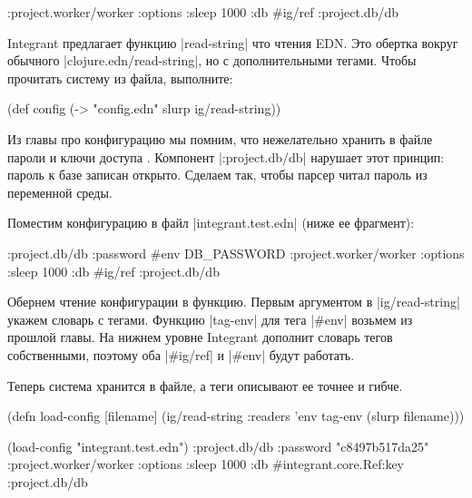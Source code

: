 \begin{english}
  \begin{clojure}
{:project.worker/worker {:options {:sleep 1000}
                         :db #ig/ref :project.db/db}}
  \end{clojure}
\end{english}

Integrant предлагает функцию \spverb|read-string| что чтения EDN. Это обертка
вокруг обычного \spverb|clojure.edn/read-string|, но с дополнительными
тегами. Чтобы прочитать систему из файла, выполните:

\begin{english}
  \begin{clojure}
(def config
  (-> "config.edn" slurp ig/read-string))
  \end{clojure}
\end{english}

Из главы про конфигурацию мы помним, что нежелательно хранить в файле пароли и
ключи доступа . Компонент \spverb|:project.db/db| нарушает
этот принцип: пароль к базе записан открыто. Сделаем так, чтобы парсер читал
пароль из переменной среды.

Поместим конфигурацию в файл \spverb|integrant.test.edn| (ниже ее фрагмент):

\begin{english}
  \begin{clojure}
{:project.db/db {:password #env DB_PASSWORD}
 :project.worker/worker {:options {:sleep 1000}
                         :db #ig/ref :project.db/db}}
  \end{clojure}
\end{english}

Обернем чтение конфигурации в функцию. Первым аргументом в
\spverb|ig/read-string| укажем словарь с тегами. Функцию \spverb|tag-env| для
тега \spverb|#env| возьмем из прошлой главы. На нижнем уровне Integrant
дополнит словарь тегов собственными, поэтому оба \spverb|#ig/ref| и
\spverb|#env| будут работать.

Теперь система хранится в файле, а теги описывают ее точнее и гибче.

\begin{english}
  \begin{clojure}
(defn load-config [filename]
  (ig/read-string {:readers {'env tag-env}}
                  (slurp filename)))

(load-config "integrant.test.edn")
{:project.db/db {:password "c8497b517da25"}
 :project.worker/worker
 {:options {:sleep 1000}
  :db #integrant.core.Ref{:key :project.db/db}}}
  \end{clojure}
\end{english}

